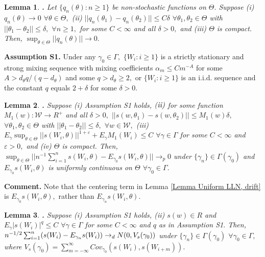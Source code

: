 \documentclass[12pt,titlepage,final,oneside,letterpaper]{article}
\newtheorem{lemma}{Lemma}[section]
\begin{document}
\begin{lemma}
\hspace{-0.08in}\textbf{.} \label{Lemma uniform convergence}Let $%
\{q_{n}(\theta ):n\geq 1\}$ be non-stochastic functions on $\Theta .$
Suppose \emph{(i)} $q_{n}(\theta )\rightarrow 0$ $\forall \theta \in \Theta
, $ \emph{(ii)} $||q_{n}(\theta _{1})-q_{n}(\theta _{2})||\leq C\delta $ $%
\forall \theta _{1},\theta _{2}\in \Theta $ with $||\theta _{1}-\theta
_{2}||\leq \delta ,$ $\forall n\geq 1,$ for some $C<\infty $ and all $\delta
>0,$ and \emph{(iii)} $\Theta $ is compact. Then, $\sup_{\theta \in \Theta
}||q_{n}(\theta )||\rightarrow 0.$
\end{lemma}

\noindent \textbf{Assumption S1. }Under any $\gamma _{0}\in \Gamma ,$ $%
\{W_{i}:i\geq 1\}$ is a strictly stationary and strong mixing sequence with
mixing coefficients $\alpha _{m}\leq Cm^{-A}$ for some $A>d_{\theta
}q/(q-d_{\theta })$ and some $q>d_{\theta }\geq 2,$ or $\{W_{i}:i\geq 1\}$
is an i.i.d. sequence and the constant $q$ equals $2+\delta $ for some $%
\delta >0.$

\begin{lemma}
\hspace{-0.08in}\textbf{.} \label{Lemma Uniform LLN, drift}Suppose \emph{(i)}
Assumption \emph{S1} holds, $\emph{(ii)}$ for some function $M_{1}(w):%
\mathcal{W}\rightarrow R^{+}$ and all $\delta >0,$ $||s(w,\theta
_{1})-s(w,\theta _{2})||\leq M_{1}(w)\delta ,$ $\forall \theta _{1},\theta
_{2}\in \Theta $ with $||\theta _{1}-\theta _{2}||\leq \delta ,$ $\forall
w\in \mathcal{W},$ \emph{(iii)} $E_{\gamma }\sup_{\theta \in \Theta
}||s(W_{i},\theta )||^{1+\varepsilon }+E_{\gamma }M_{1}(W_{i})\leq C$ $%
\forall \gamma \in \Gamma $ for some $C<\infty $ and $\varepsilon >0,$ and 
\emph{(iv)} $\Theta $ is compact. Then, $\sup_{\theta \in \Theta
}||n^{-1}\sum_{i=1}^{n}s(W_{i},\theta )-E_{\gamma _{0}}s(W_{i},\theta
)||\rightarrow _{p}0$ under $\{\gamma _{n}\}\in \Gamma (\gamma _{0})$ and $%
E_{\gamma _{0}}s(W_{i},\theta )$ is uniformly continuous on $\Theta $ $%
\forall \gamma _{0}\in \Gamma .$
\end{lemma}

\noindent \textbf{Comment.} Note that the centering term in Lemma \ref{Lemma
Uniform LLN, drift} is $E_{\gamma _{0}}s(W_{i},\theta ),$ rather than $%
E_{\gamma _{n}}s(W_{i},\theta ).$

\begin{lemma}
\hspace{-0.08in}\textbf{.} \label{Lemma CLT, array}Suppose \emph{(i)}
Assumption \emph{S1} holds, \emph{(ii)} $s(w)\in R$ and $E_{\gamma
}|s(W_{i})|^{q}\leq C$ $\forall \gamma \in \Gamma $ for some $C<\infty $ and 
$q$ as in Assumption \emph{S1}$.$ Then, $n^{-1/2}\sum_{i=1}^{n}(s(W_{i})-E_{%
\gamma _{n}}s(W_{i}))\rightarrow _{d}N(0,V_{s}(\gamma _{0}))$ under $\{
\gamma _{n}\} \in \Gamma (\gamma _{0})$ $\forall \gamma _{0}\in \Gamma ,$
where $V_{s}(\gamma _{0})=\sum_{m=-\infty }^{\infty }\allowbreak Cov_{\gamma
_{0}}(s(W_{i}),s(W_{i+m})).$
\end{lemma}
\end{document}
